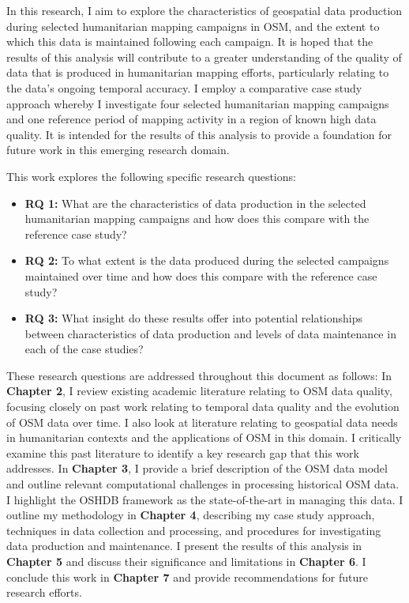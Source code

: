 In this research, I aim to explore the characteristics of geospatial data production during selected humanitarian mapping campaigns in OSM, and the extent to which this data is maintained following each campaign. It is hoped that the results of this analysis will contribute to a greater understanding of the quality of data that is produced in humanitarian mapping efforts, particularly relating to the data’s ongoing temporal accuracy. I employ a comparative case study approach whereby I investigate four selected humanitarian mapping campaigns and one reference period of mapping activity in a region of known high data quality. It is intended for the results of this analysis to provide a foundation for future work in this emerging research domain. 

This work explores the following specific research questions: 

\begin{itemize}
    \item \textbf{RQ 1:} What are the characteristics of data production in the selected humanitarian mapping campaigns and how does this compare with the reference case study?
    \item \textbf{RQ 2:} To what extent is the data produced during the selected campaigns maintained over time and how does this compare with the reference case study? 
    \item \textbf{RQ 3:} What insight do these results offer into potential relationships between characteristics of data production and levels of data maintenance in each of the case studies? 
\end{itemize}

These research questions are addressed throughout this document as follows: In \textbf{Chapter 2}, I review existing academic literature relating to OSM data quality, focusing closely on past work relating to temporal data quality and the evolution of OSM data over time. I also look at literature relating to geospatial data needs in humanitarian contexts and the applications of OSM in this domain. I critically examine this past literature to identify a key research gap that this work addresses. In \textbf{Chapter 3}, I provide a brief description of the OSM data model and outline relevant computational challenges in processing historical OSM data. I highlight the OSHDB framework \parencite{raifer_oshdb_2019} as the state-of-the-art in managing this data. I outline my methodology in \textbf{Chapter 4}, describing my case study approach, techniques in data collection and processing, and procedures for investigating data production and maintenance. I present the results of this analysis in \textbf{Chapter 5} and discuss their significance and limitations in \textbf{Chapter 6}. I conclude this work in \textbf{Chapter 7} and provide recommendations for future research efforts. 

